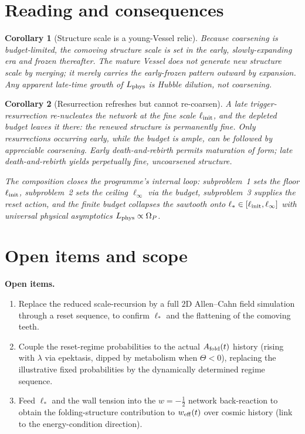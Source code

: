 \documentclass[11pt,a4paper,oneside]{book}
\newcommand{\Op}{\Omega_P}
\newcommand{\note}[1]{\textcolor{black!65}{\emph{#1}}}
\newcommand{\Af}{A_{\rm fold}}
\newcommand{\Lp}{L_{\rm phys}}
\newcommand{\linit}{\ell_{\rm init}}
\theoremstyle{plain}
\newtheorem{corollary}{Corollary}[chapter]
\theoremstyle{definition}
\theoremstyle{remark}
\begin{document}
\section{Reading and consequences}

\begin{corollary}[Structure scale is a young-Vessel relic]
Because coarsening is budget-limited, the comoving structure scale is set in the early, slowly-expanding
era and frozen thereafter. The mature Vessel does not generate new structure scale by merging; it merely
carries the early-frozen pattern outward by expansion. Any apparent late-time growth of $\Lp$ is Hubble
dilution, not coarsening.
\end{corollary}

\begin{corollary}[Resurrection refreshes but cannot re-coarsen]
A late trigger-resurrection re-nucleates the network at the fine scale $\linit$, and the depleted budget
leaves it there: the renewed structure is permanently fine. Only resurrections occurring early, while the
budget is ample, can be followed by appreciable coarsening. Early death-and-rebirth permits maturation of
form; late death-and-rebirth yields perpetually fine, uncoarsened structure.
\end{corollary}

\note{The composition closes the programme's internal loop: subproblem~1 sets the floor $\linit$,
subproblem~2 sets the ceiling $\ell_\infty$ via the budget, subproblem~3 supplies the reset action, and
the finite budget collapses the sawtooth onto $\ell_\ast\in[\linit,\ell_\infty]$ with universal physical
asymptotics $\Lp\propto\Op$.}

\section{Open items and scope}

\textbf{Open items.}
\begin{enumerate}[leftmargin=1.6em,itemsep=2pt]
\item Replace the reduced scale-recursion by a full $2$D Allen--Cahn field simulation through a reset
sequence, to confirm $\ell_\ast$ and the flattening of the comoving teeth.
\item Couple the reset-regime probabilities to the actual $\Af(t)$ history (rising with $\lambda$ via
epektasis, dipped by metabolism when $\Theta<0$), replacing the illustrative fixed probabilities by the
dynamically determined regime sequence.
\item Feed $\ell_\ast$ and the wall tension into the $w=-\tfrac12$ network back-reaction to obtain the
folding-structure contribution to $w_{\rm eff}(t)$ over cosmic history (link to the energy-condition
direction).
\end{enumerate}
\end{document}
